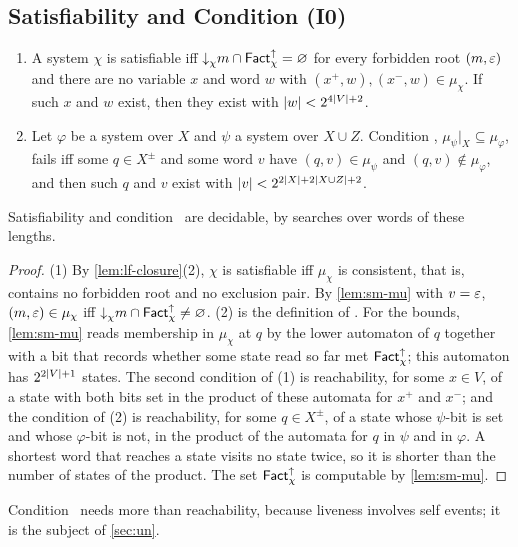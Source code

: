 \subsection{Satisfiability and Condition (I0)}\label{sec:sm-decide}

\begin{proposition}\label{prop:sm-decide}
\leavevmode
\begin{enumerate}[leftmargin=*]
\item A system $\chi$ is satisfiable iff $\mathord{\downarrow}_{\chi} m\cap\mathsf{Fact}^{\uparrow}_{\chi}=\varnothing$
  for every forbidden root $(m,\varepsilon)$ and there are no variable $x$ and word
  $w$ with $(x^+,w),(x^-,w)\in\mu_\chi$. If such $x$ and $w$ exist, then they
  exist with $\lvert w\rvert<2^{4\lvert V\rvert+2}$.
\item Let $\varphi$ be a system over $X$ and $\psi$ a system over $X\cup Z$.
  Condition \CondI, $\mu_\psi|_X\subseteq\mu_\varphi$, fails iff some
  $q\in X^\pm$ and some word $v$ have $(q,v)\in\mu_\psi$ and
  $(q,v)\notin\mu_\varphi$, and then such $q$ and $v$ exist with
  $\lvert v\rvert<2^{2\lvert X\rvert+2\lvert X\cup Z\rvert+2}$.
\end{enumerate}
Satisfiability and condition \CondI\ are decidable, by searches over words of
these lengths.
\end{proposition}

\begin{proof}
(1) By \cref{lem:lf-closure}(2), $\chi$ is satisfiable iff $\mu_\chi$ is
consistent, that is, contains no forbidden root and no exclusion pair. By
\cref{lem:sm-mu} with $v=\varepsilon$, $(m,\varepsilon)\in\mu_\chi$ iff
$\mathord{\downarrow}_{\chi} m\cap\mathsf{Fact}^{\uparrow}_{\chi}\ne\varnothing$. (2) is the definition of \CondI. For
the bounds, \cref{lem:sm-mu} reads membership in $\mu_\chi$ at $q$ by the
lower automaton of $q$ together with a bit that records whether some state
read so far met $\mathsf{Fact}^{\uparrow}_{\chi}$; this automaton has $2^{2\lvert V\rvert+1}$ states. The
second condition of (1) is reachability, for some $x\in V$, of a state with
both bits set in the product of these automata for $x^+$ and $x^-$; and the
condition of (2) is reachability, for some $q\in X^\pm$, of a state whose
$\psi$-bit is set and whose $\varphi$-bit is not, in the product of the
automata for $q$ in $\psi$ and in $\varphi$. A shortest word that reaches a
state visits no state twice, so it is shorter than the number of states of the
product. The set $\mathsf{Fact}^{\uparrow}_{\chi}$ is computable by \cref{lem:sm-mu}.
\end{proof}

Condition
\CondU\ needs more than reachability, because liveness involves self events; it
is the subject of \cref{sec:un}.
